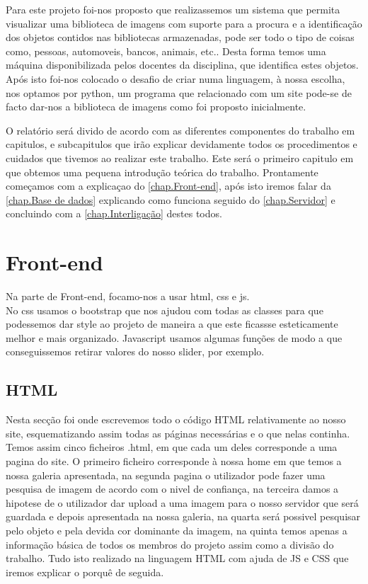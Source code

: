 \documentclass{report}
\begin{document}
Para este projeto foi-nos proposto que realizassemos um sistema que permita visualizar uma biblioteca de imagens com suporte para a procura e a identificação dos objetos contidos nas bibliotecas armazenadas, pode ser todo o tipo de coisas como, pessoas, automoveis, bancos, animais, etc.. Desta forma temos uma máquina disponibilizada pelos docentes da disciplina, que identifica estes objetos. Após isto foi-nos colocado o desafio de criar numa linguagem, à nossa escolha, nos optamos por python, um programa que relacionado com um site pode-se de facto dar-nos a biblioteca de imagens como foi proposto inicialmente.

O relatório será divido de acordo com as diferentes componentes do trabalho em capitulos, e subcapitulos que irão explicar devidamente todos os procedimentos e cuidados que tivemos ao realizar este trabalho. Este será o primeiro capitulo em que obtemos uma pequena introdução teórica do trabalho. Prontamente começamos com a explicaçao do \autoref{chap.Front-end}, após isto iremos falar da \autoref{chap.Base de dados} explicando como funciona seguido do \autoref{chap.Servidor} e concluindo com a \autoref{chap.Interligação} destes todos.




\chapter{Front-end}
\label{chap.Front-end}

Na parte de Front-end, focamo-nos a usar html, css e js. \\
No css usamos o bootstrap que nos ajudou com todas as classes para que podessemos dar style ao projeto de maneira a que este ficassse esteticamente melhor e mais organizado. Javascript usamos algumas funções de modo a que conseguissemos retirar valores do nosso slider, por exemplo.

\section{HTML}
Nesta secção foi onde escrevemos todo o código HTML relativamente ao nosso site, esquematizando assim todas as páginas necessárias e o que nelas continha. Temos assim cinco ficheiros .html, em que cada um deles corresponde a uma pagina do site. O primeiro ficheiro corresponde à nossa home em que temos a nossa galeria apresentada, na segunda pagina o utilizador pode fazer uma pesquisa de imagem de acordo com o nivel de confiança, na terceira damos a hipotese de o utilizador dar upload a uma imagem para o nosso servidor que será guardada e depois apresentada na nossa galeria, na quarta será possivel pesquisar pelo objeto e pela devida cor dominante da imagem, na quinta temos apenas a informação básica de todos os membros do projeto assim como a divisão do trabalho. Tudo isto realizado na linguagem HTML com ajuda de JS e CSS que iremos explicar o porquê de seguida.
\end{document}
